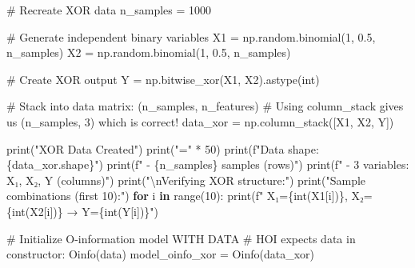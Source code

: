 \documentclass[
  11pt,
  letterpaper,
  oneside,
  openany]{book}
\newenvironment{Shaded}{\begin{snugshade}}{\end{snugshade}}
\newcommand{\BuiltInTok}[1]{\textcolor[rgb]{0.00,0.23,0.31}{#1}}
\newcommand{\CharTok}[1]{\textcolor[rgb]{0.13,0.47,0.30}{#1}}
\newcommand{\CommentTok}[1]{\textcolor[rgb]{0.37,0.37,0.37}{#1}}
\newcommand{\ControlFlowTok}[1]{\textcolor[rgb]{0.00,0.23,0.31}{\textbf{#1}}}
\newcommand{\DecValTok}[1]{\textcolor[rgb]{0.68,0.00,0.00}{#1}}
\newcommand{\FloatTok}[1]{\textcolor[rgb]{0.68,0.00,0.00}{#1}}
\newcommand{\KeywordTok}[1]{\textcolor[rgb]{0.00,0.23,0.31}{\textbf{#1}}}
\newcommand{\NormalTok}[1]{\textcolor[rgb]{0.00,0.23,0.31}{#1}}
\newcommand{\OperatorTok}[1]{\textcolor[rgb]{0.37,0.37,0.37}{#1}}
\newcommand{\SpecialCharTok}[1]{\textcolor[rgb]{0.37,0.37,0.37}{#1}}
\newcommand{\SpecialStringTok}[1]{\textcolor[rgb]{0.13,0.47,0.30}{#1}}
\newcommand{\StringTok}[1]{\textcolor[rgb]{0.13,0.47,0.30}{#1}}
\begin{document}
\begin{Shaded}
\begin{Highlighting}[]
\CommentTok{\# Recreate XOR data}
\NormalTok{n\_samples }\OperatorTok{=} \DecValTok{1000}

\CommentTok{\# Generate independent binary variables}
\NormalTok{X1 }\OperatorTok{=}\NormalTok{ np.random.binomial(}\DecValTok{1}\NormalTok{, }\FloatTok{0.5}\NormalTok{, n\_samples)}
\NormalTok{X2 }\OperatorTok{=}\NormalTok{ np.random.binomial(}\DecValTok{1}\NormalTok{, }\FloatTok{0.5}\NormalTok{, n\_samples)}

\CommentTok{\# Create XOR output}
\NormalTok{Y }\OperatorTok{=}\NormalTok{ np.bitwise\_xor(X1, X2).astype(}\BuiltInTok{int}\NormalTok{)}

\CommentTok{\# Stack into data matrix: (n\_samples, n\_features)}
\CommentTok{\# Using column\_stack gives us (n\_samples, 3) which is correct!}
\NormalTok{data\_xor }\OperatorTok{=}\NormalTok{ np.column\_stack([X1, X2, Y])}

\BuiltInTok{print}\NormalTok{(}\StringTok{"XOR Data Created"}\NormalTok{)}
\BuiltInTok{print}\NormalTok{(}\StringTok{"="} \OperatorTok{*} \DecValTok{50}\NormalTok{)}
\BuiltInTok{print}\NormalTok{(}\SpecialStringTok{f"Data shape: }\SpecialCharTok{\{}\NormalTok{data\_xor}\SpecialCharTok{.}\NormalTok{shape}\SpecialCharTok{\}}\SpecialStringTok{"}\NormalTok{)}
\BuiltInTok{print}\NormalTok{(}\SpecialStringTok{f"  {-} }\SpecialCharTok{\{}\NormalTok{n\_samples}\SpecialCharTok{\}}\SpecialStringTok{ samples (rows)"}\NormalTok{)}
\BuiltInTok{print}\NormalTok{(}\SpecialStringTok{f"  {-} 3 variables: X₁, X₂, Y (columns)"}\NormalTok{)}
\BuiltInTok{print}\NormalTok{(}\StringTok{"}\CharTok{\textbackslash{}n}\StringTok{Verifying XOR structure:"}\NormalTok{)}
\BuiltInTok{print}\NormalTok{(}\StringTok{"Sample combinations (first 10):"}\NormalTok{)}
\ControlFlowTok{for}\NormalTok{ i }\KeywordTok{in} \BuiltInTok{range}\NormalTok{(}\DecValTok{10}\NormalTok{):}
    \BuiltInTok{print}\NormalTok{(}\SpecialStringTok{f"  X₁=}\SpecialCharTok{\{}\BuiltInTok{int}\NormalTok{(X1[i])}\SpecialCharTok{\}}\SpecialStringTok{, X₂=}\SpecialCharTok{\{}\BuiltInTok{int}\NormalTok{(X2[i])}\SpecialCharTok{\}}\SpecialStringTok{ → Y=}\SpecialCharTok{\{}\BuiltInTok{int}\NormalTok{(Y[i])}\SpecialCharTok{\}}\SpecialStringTok{"}\NormalTok{)}

\CommentTok{\# Initialize O{-}information model WITH DATA}
\CommentTok{\# HOI expects data in constructor: Oinfo(data)}
\NormalTok{model\_oinfo\_xor }\OperatorTok{=}\NormalTok{ Oinfo(data\_xor)}


\end{Highlighting}
\end{Shaded}
\end{document}

